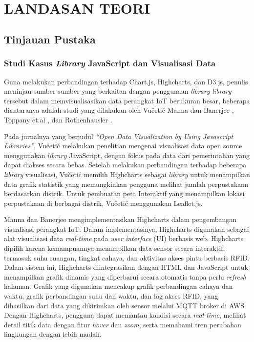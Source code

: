 \chapter[LANDASAN TEORI]{\\ LANDASAN TEORI}

\section{Tinjauan Pustaka}
\subsection{Studi Kasus \textit{Library} JavaScript dan Visualisasi Data}
Guna melakukan perbandingan terhadap Chart.js, Highcharts, dan D3.js, penulis meninjau sumber-sumber yang berkaitan dengan penggunaan \textit{library}-\textit{library} tersebut dalam memvisualisasikan data perangkat IoT berukuran besar, beberapa diantaranya adalah studi yang dilakukan oleh Vučetić \cite{Vueti2023} Manna dan Banerjee \cite{Manna2024}, Toppany et.al \cite{Toppany2023}, dan Rothenhausler \cite{Rothenhausler2022}.

Pada jurnalnya yang berjudul \textit{“Open Data Visualization by Using Javascript Libraries”}, Vučetić \cite{Vueti2023} melakukan penelitian mengenai visualisasi data open source menggunakan \textit{library} JavaScript, dengan fokus pada data dari pemerintahan yang dapat diakses secara bebas. Setelah melakukan perbandingan terhadap beberapa \textit{library} visualisasi, Vučetić memilih Highcharts sebagai \textit{library} untuk menampilkan data grafik statistik yang memungkinkan pengguna melihat jumlah perpustakaan berdasarkan distrik. Untuk pembuatan peta Interaktif yang menampilkan lokasi perpustakaan di berbagai distrik, Vučetić menggunakan Leaflet.js. 

Manna dan Banerjee \cite{Manna2024} mengimplementasikan Highcharts dalam pengembangan visualisasi perangkat IoT. Dalam implementasinya, Highcharts digunakan sebagai alat visualisasi data \textit{real-time} pada \textit{user interface} (UI) berbasis web. Highcharts dipilih karena kemampuannya menampilkan data sensor secara interaktif, termasuk suhu ruangan, tingkat cahaya, dan aktivitas akses pintu berbasis RFID. Dalam sistem ini, Highcharts diintegrasikan dengan HTML dan JavaScript untuk menampilkan grafik dinamis yang diperbarui secara otomatis tanpa perlu \textit{refresh} halaman. Grafik yang digunakan mencakup grafik perbandingan cahaya dan waktu, grafik perbandingan suhu dan waktu, dan log akses RFID, yang dihasilkan dari data yang dikirimkan oleh sensor melalui MQTT broker di AWS. Dengan Highcharts, pengguna dapat memantau kondisi secara \textit{real-time}, melihat detail titik data dengan fitur \textit{hover} dan \textit{zoom}, serta memahami tren perubahan lingkungan dengan lebih mudah.

